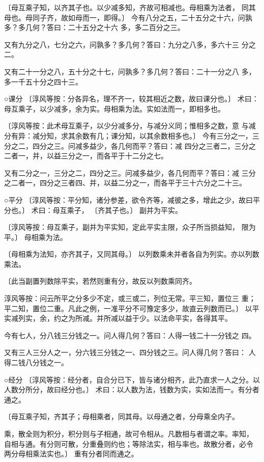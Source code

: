 \documentclass[a4paper,12pt,UTF8,twoside]{ctexbook}
\begin{document}
〔母互乘子知，以齐其子也。以少减多知，齐故可相减也。母相乘为法者， 同其母也。母同子齐，故如母而一，即得。〕 今有八分之五，二十五分之十六，问孰多？多几何？答曰：二十五分之十六 多，多二百分之三。

又有九分之八，七分之六，问孰多？多几何？答曰：九分之八多，多六十三 分之二。

又有二十一分之八，五十分之十七，问孰多？多几何？答曰：二十一分之八 多，多一千五十分之四十三。

○课分 〔淳风等按：分各异名，理不齐一，较其相近之数，故曰课分也。〕 术曰：母互乘子，以少减多，余为实。母相乘为法。实如法而一，即相多也。

〔淳风等按：此术母互乘子，以少分减多分，与减分义同；惟相多之数，意 与减分有异：减分知，求其余数有几；课分知，以其余数相多也。〕 今有三分之一，三分之二，四分之三。问减多益少，各几何而平？答曰：减 四分之三者二，三分之二者一，并，以益三分之一，而各平于十二分之七。

又有二分之一，三分之二，四分之三。问减多益少，各几何而平？答曰：减 三分之二者一，四分之三者四、并，以益二分之一，而各平于三十六分之二十三。

○平分 〔淳风等按：平分知，诸分参差，欲令齐等，减彼之多，增此之少，故曰平 分也。〕 术曰：母互乘子， 〔齐其子也。〕 副并为平实。

〔淳风等按：母互乘子，副并为平实知，定此平实主限，众子所当损益知， 限为平。〕 母相乘为法。

〔母相乘为法知，亦齐其子，又同其母。〕 以列数乘未并者各自为列实。亦以列数乘法。

〔此当副置列数除平实，若然则重有分，故反以列数乘同齐。

淳风等按：问云所平之分多少不定，或三或二，列位无常。平三知，置位三 重；平二知，置位二重。凡此之例，一准平分不可豫定多少，故直云列数而已。〕 以平实减列实，余，约之为所减。并所减以益于少。以法命平实，各得其平。

今有七人，分八钱三分钱之一。问人得几何？答曰：人得一钱二十一分钱之 四。

又有三人三分人之一，分六钱三分钱之一、四分钱之三。问人得几何？答曰： 人得二钱八分钱之一。

○经分 〔淳风等按：经分者，自合分已下，皆与诸分相齐，此乃直求一人之分。以 人数分所分，故曰经分也。〕 术曰：以人数为法，钱数为实，实如法而一。有分者通之。

〔母互乘子知，齐其子；母相乘者，同其母。以母通之者，分母乘全内子。

乘，散全则为积分，积分则与子相通，故可令相从。凡数相与者谓之率。率知， 自相与通。有分则可散，分重叠则约也；等除法实，相与率也。故散分者，必令 两分母相乘法实也。〕 重有分者同而通之。
\end{document}

